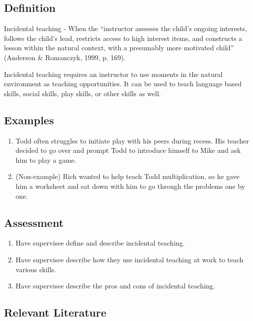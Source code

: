 \subsection{Definition}
Incidental teaching - When the ``instructor assesses the child's ongoing interests, follows the child's lead, restricts access to high interest items, and constructs a lesson within the natural context, with a presumably more motivated child'' (Anderson \& Romanczyk, 1999, p. 169).

Incidental teaching requires an instructor to use moments in the natural environment as teaching opportunities. It can be used to teach language based skills, social skills, play skills, or other skills as well.

\subsection{Examples}
\begin{enumerate}
\item Todd often struggles to initiate play with his peers during recess. His teacher decided to go over and prompt Todd to introduce himself to Mike and ask him to play a game. 
\item (Non-example) Rich wanted to help teach Todd multiplication, so he gave him a worksheet and sat down with him to go through the problems one by one.
\end{enumerate}
%
\subsection{Assessment}
\begin{enumerate}
\item Have supervisee define and describe incidental teaching.
\item Have supervisee describe how they use incidental teaching at work to teach various skills.
\item Have supervisee describe the pros and cons of incidental teaching.
%
\end{enumerate}
%
\subsection{Relevant Literature}
\begin{refsection}
\nocite{anderson1999early,
        cooper2007applied,
        hart1975incidental,
        mcgee2007incidental,
        mcgee1999incidental,
        mcgee1983modified}
\printbibliography[heading=none]
\end{refsection}
%
